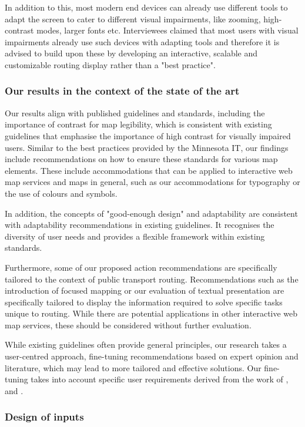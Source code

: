 \documentclass[agile, final]{copernicus-agile}
\begin{document}
In addition to this, most modern end devices can already use different tools to adapt the screen to cater to different visual impairments, like zooming, high-contrast modes, larger fonts etc. Interviewees claimed that most users with visual impairments already use such devices with adapting tools and therefore it is advised to build upon these by developing an interactive, scalable and customizable routing display rather than a "best practice".

\subsubsection{Our results in the context of the state of the art}

Our results align with published guidelines and standards, including the importance of contrast for map legibility, which is consistent with existing guidelines that emphasise the importance of high contrast for visually impaired users. Similar to the best practices provided by the Minnesota IT, our findings include recommendations on how to ensure these standards for various map elements. These include accommodations that can be applied to interactive web map services and maps in general, such as our accommodations for typography or the use of colours and symbols.

In addition, the concepts of "good-enough design" and adaptability are consistent with adaptability recommendations in existing guidelines. It recognises the diversity of user needs and provides a flexible framework within existing standards.

Furthermore, some of our proposed action recommendations are specifically tailored to the context of public transport routing. Recommendations such as the introduction of focused mapping or our evaluation of textual presentation are specifically tailored to display the information required to solve specific tasks unique to routing. While there are potential applications in other interactive web map services, these should be considered without further evaluation.

While existing guidelines often provide general principles, our research takes a user-centred approach, fine-tuning recommendations based on expert opinion and literature, which may lead to more tailored and effective solutions. Our fine-tuning takes into account specific user requirements derived from the work of \citet{EngelEA2022}, \citet{Delikostidis2011} and \citet{Agrawala2002}. 

\subsubsection{Design of inputs}
\end{document}
